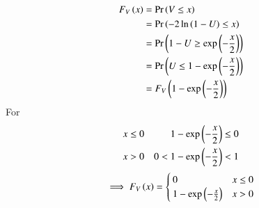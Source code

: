 \documentclass[journal,12pt,twocolumn]{IEEEtran}
\renewcommand\thesection{\arabic{section}}
\begin{document}
\begin{enumerate}[label=\thesection.\arabic*
,ref=\thesection.\theenumi]
\begin{align}
    F_{V}\left(x\right)&=\Pr\left(V\leq x\right)\\
    &=\Pr\left(-2\ln{\ensuremath{\left(1-U\right)}}\leq x\right)\\
    &=\Pr\left(1-U\geq \exp\left(-\frac{x}{2}\right)\right)\\
    &=\Pr\left(U\leq 1-\exp\left(-\frac{x}{2}\right)\right)\\
    &=F_{V}\left(1-\exp\left(-\frac{x}{2}\right)\right)
\end{align}
For \begin{align}
&x\leq 0 & 1-\exp\left(-\frac{x}{2}\right)\leq 0 \\
&x>0  & 0<1-\exp\left(-\frac{x}{2}\right)<1
\end{align}
\begin{align}
    \implies F_{V}\left(x\right)=\begin{cases}
    0  &x\leq 0\\
    1-\exp\left(-\frac{x}{2}\right) & x>0
    \end{cases}
\end{align}
\end{enumerate}
\end{document}
